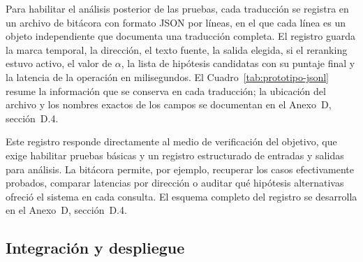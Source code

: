 \documentclass[12pt,a4paper,oneside]{book}
\begin{document}
Para habilitar el análisis posterior de las pruebas, cada traducción se registra en un archivo de bitácora con formato JSON por líneas, en el que cada línea es un objeto independiente que documenta una traducción completa. El registro guarda la marca temporal, la dirección, el texto fuente, la salida elegida, si el reranking estuvo activo, el valor de \(\alpha\), la lista de hipótesis candidatas con su puntaje final y la latencia de la operación en milisegundos. El Cuadro~\ref{tab:prototipo-jsonl} resume la información que se conserva en cada traducción; la ubicación del archivo y los nombres exactos de los campos se documentan en el Anexo~D, sección~D.4.

\begin{table}[h]
\centering
\caption{Información que el prototipo conserva en el registro de uso por cada traducción.}
\label{tab:prototipo-jsonl}
\end{table}

Este registro responde directamente al medio de verificación del objetivo, que exige habilitar pruebas básicas y un registro estructurado de entradas y salidas para análisis. La bitácora permite, por ejemplo, recuperar los casos efectivamente probados, comparar latencias por dirección o auditar qué hipótesis alternativas ofreció el sistema en cada consulta. El esquema completo del registro se desarrolla en el Anexo~D, sección~D.4.

\subsection{Integración y despliegue}\label{prototipo-despliegue}
\end{document}
